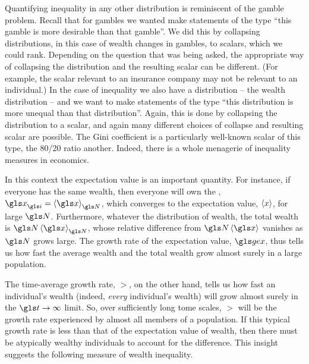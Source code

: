 Quantifying inequality in any other distribution is reminiscent of the gamble 
problem. Recall that for gambles we wanted make statements of the type ``this gamble 
is more desirable than that gamble''. We did this by collapsing distributions, in this case of wealth changes in gambles, to scalars, which we could rank.
Depending on the question that was being asked, the appropriate way of collapsing the distribution and the resulting scalar can be different. (For example, the scalar relevant to an insurance company may not be relevant to an individual.)
In the case of inequality we also have a distribution -- the wealth distribution -- and we 
want to make statements of the type ``this distribution is more unequal than that 
distribution''. Again, this is done by collapsing the distribution to a scalar, and again 
many different choices of collapse and resulting scalar are possible. The Gini 
coefficient is a particularly well-known scalar of this type, the 80/20 ratio another. Indeed, there is a whole menagerie of inequality measures in economics.

In this context the expectation value is an important quantity. 
For instance, if everyone has the same wealth, then everyone will own the \FEA, $\x_\gi=\ave{\x}_\N$, which converges to the expectation value, $\left\langle x\right\rangle$, for large $\N$.
Furthermore, whatever the distribution of wealth, the total wealth is $\N\ave{\x}_\N$, whose relative difference from $\N\ave{\x}$ vanishes as $\N$ grows large.
The growth rate of the expectation value, $\gex$, thus tells us how fast the average wealth and the total wealth grow almost surely in a large population.

The time-average growth rate, $\gt$, on the other hand, tells us how fast an individual's wealth (indeed, \textit{every} individual's wealth) will grow almost surely in the $\t\to\infty$ limit.
So, over sufficiently long tome scales, $\gt$ will be the growth rate experienced by almost all members of a population.
If this typical growth rate is less than that of the expectation value of wealth, then there must be atypically wealthy individuals to account for the difference. This insight suggests the following measure of wealth inequality.



